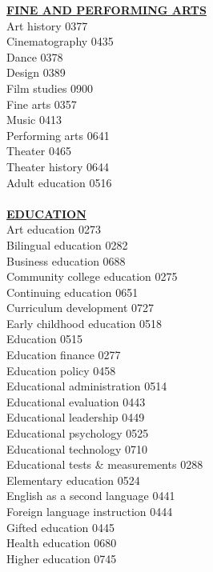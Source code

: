 \documentclass[9pt,twoside]{article}
\newcommand{\categoryheading}[1]{{\fontsize{8}{11}\selectfont \textbf{\uline{#1}}}}
\begin{document}
{\begin{multicols}{3}
\categoryheading{FINE AND PERFORMING ARTS} \\
Art history \hfill 0377 \\
Cinematography \hfill 0435 \\
Dance \hfill 0378 \\
Design \hfill 0389 \\
Film studies \hfill 0900 \\
Fine arts \hfill 0357 \\
Music \hfill 0413 \\
Performing arts \hfill 0641 \\
Theater \hfill 0465 \\
Theater history \hfill 0644 \\
Adult education \hfill 0516 \\
\columnbreak \\
\categoryheading{EDUCATION} \\
Art education \hfill 0273 \\
Bilingual education \hfill 0282 \\
Business education \hfill 0688 \\
Community college education \hfill 0275 \\
Continuing education \hfill 0651 \\
Curriculum development \hfill 0727 \\
Early childhood education \hfill 0518 \\
Education \hfill 0515 \\
Education finance \hfill 0277 \\
Education policy \hfill 0458 \\
Educational administration \hfill 0514 \\
Educational evaluation \hfill 0443 \\
Educational leadership \hfill 0449 \\
Educational psychology \hfill 0525 \\
Educational technology \hfill 0710 \\
Educational tests \& measurements \hfill 0288 \\
Elementary education \hfill 0524 \\
English as a second language \hfill 0441 \\
Foreign language instruction \hfill 0444 \\
Gifted education \hfill 0445 \\
Health education \hfill 0680 \\
Higher education \hfill 0745 \\

\end{multicols}}
\end{document}
